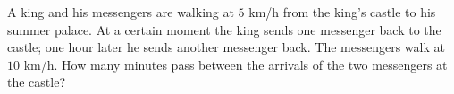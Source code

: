A king and his messengers are walking at $5$ km/h from the king's castle to his summer palace. At a certain moment the king sends one messenger back to the castle; one hour later he sends another messenger back. The messengers walk at $10$ km/h. How many minutes pass between the arrivals of the two messengers at the castle?
